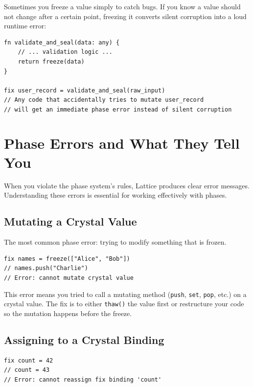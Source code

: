 Sometimes you freeze a value simply to catch bugs.
If you know a value should not change after a certain point, freezing it converts silent corruption into a loud runtime error:

\begin{lstlisting}[language=Lattice, caption={Freezing for correctness}]
fn validate_and_seal(data: any) {
    // ... validation logic ...
    return freeze(data)
}

fix user_record = validate_and_seal(raw_input)
// Any code that accidentally tries to mutate user_record
// will get an immediate phase error instead of silent corruption
\end{lstlisting}

\section{Phase Errors and What They Tell You}\label{sec:phase-errors}


When you violate the phase system's rules, Lattice produces clear error messages.
Understanding these errors is essential for working effectively with phases.

\subsection{Mutating a Crystal Value}

The most common phase error: trying to modify something that is frozen.

\begin{lstlisting}[language=Lattice, caption={Crystal mutation error}]
fix names = freeze(["Alice", "Bob"])
// names.push("Charlie")
// Error: cannot mutate crystal value
\end{lstlisting}

This error means you tried to call a mutating method (\lstinline|push|, \lstinline|set|, \lstinline|pop|, etc.) on a crystal value.
The fix is to either \lstinline|thaw()| the value first or restructure your code so the mutation happens before the freeze.

\subsection{Assigning to a Crystal Binding}

\begin{lstlisting}[language=Lattice, caption={Crystal assignment error}]
fix count = 42
// count = 43
// Error: cannot reassign fix binding 'count'
\end{lstlisting}

